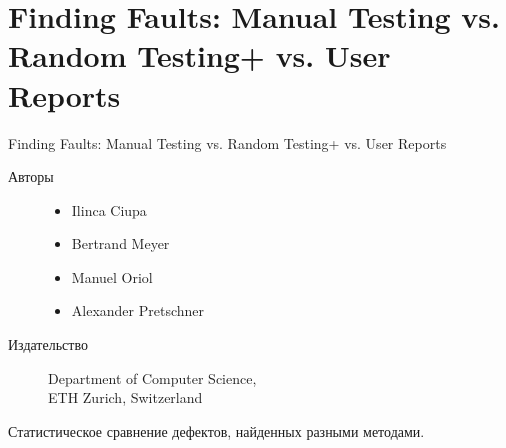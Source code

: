 \documentclass[11pt,pdf,hyperref=unicode,hyperref={bookmarks=false}]{beamer}
\begin{document}
    \section{Finding Faults: Manual Testing vs. Random Testing+ vs. User Reports}
        \begin{frame}{Finding Faults: Manual Testing vs. Random Testing+ vs. User Reports}
            \begin{description}
                \item[Авторы] \begin{itemize} \item Ilinca Ciupa\item Bertrand Meyer\item Manuel Oriol\item Alexander Pretschner\end{itemize}
                \item[Издательство] Department of Computer Science,\\ETH Zurich, Switzerland
            \end{description}
Статистическое сравнение дефектов, найденных разными методами.
        \end{frame}
\end{document}
